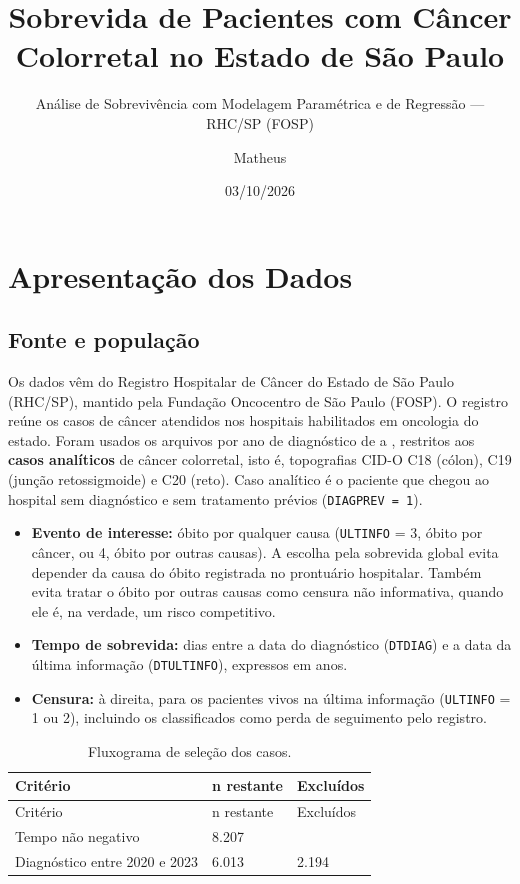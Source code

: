 \documentclass[
  brazilian,
]{article}
\title{Sobrevida de Pacientes com Câncer Colorretal no Estado de São
Paulo}
\subtitle{Análise de Sobrevivência com Modelagem Paramétrica e de
Regressão --- RHC/SP (FOSP)}
\author{Matheus}
\date{03/10/2026}
\providecommand{\tightlist}{%
  \setlength{\itemsep}{0pt}\setlength{\parskip}{0pt}}
\begin{document}
\maketitle

{
\setcounter{tocdepth}{2}
\tableofcontents
}
\section{Apresentação dos Dados}\label{apresentauxe7uxe3o-dos-dados}

\subsection{Fonte e população}\label{fonte-e-populauxe7uxe3o}

Os dados vêm do Registro Hospitalar de Câncer do Estado de São Paulo
(RHC/SP), mantido pela Fundação Oncocentro de São Paulo (FOSP). O
registro reúne os casos de câncer atendidos nos hospitais habilitados em
oncologia do estado. Foram usados os arquivos por ano de diagnóstico de
 a , restritos aos \textbf{casos analíticos} de
câncer colorretal, isto é, topografias CID-O C18 (cólon), C19 (junção
retossigmoide) e C20 (reto). Caso analítico é o paciente que chegou ao
hospital sem diagnóstico e sem tratamento prévios
(\texttt{DIAGPREV\ =\ 1}).

\begin{itemize}
\tightlist
\item
  \textbf{Evento de interesse:} óbito por qualquer causa
  (\texttt{ULTINFO} = 3, óbito por câncer, ou 4, óbito por outras
  causas). A escolha pela sobrevida global evita depender da causa do
  óbito registrada no prontuário hospitalar. Também evita tratar o óbito
  por outras causas como censura não informativa, quando ele é, na
  verdade, um risco competitivo.
\item
  \textbf{Tempo de sobrevida:} dias entre a data do diagnóstico
  (\texttt{DTDIAG}) e a data da última informação (\texttt{DTULTINFO}),
  expressos em anos.
\item
  \textbf{Censura:} à direita, para os pacientes vivos na última
  informação (\texttt{ULTINFO} = 1 ou 2), incluindo os classificados
  como perda de seguimento pelo registro.
\end{itemize}

\begin{longtable}[]{@{}lll@{}}
\caption{Fluxograma de seleção dos casos.}\tabularnewline
\toprule\noalign{}
Critério & n restante & Excluídos \\
\midrule\noalign{}
\endfirsthead
\toprule\noalign{}
Critério & n restante & Excluídos \\
\midrule\noalign{}
\endhead
\bottomrule\noalign{}
\endlastfoot
Tempo não negativo & 8.207 & \\
Diagnóstico entre 2020 e 2023 & 6.013 & 2.194 \\
\end{longtable}
\end{document}
